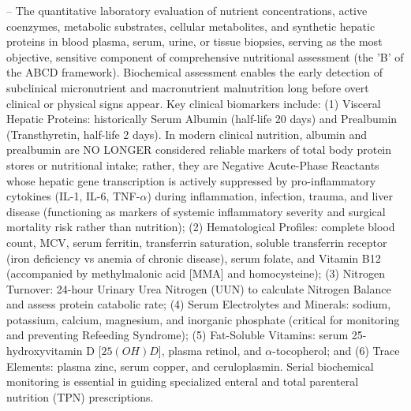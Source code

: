 -- The quantitative laboratory evaluation of nutrient concentrations, active coenzymes, metabolic substrates, cellular metabolites, and synthetic hepatic proteins in blood plasma, serum, urine, or tissue biopsies, serving as the most objective, sensitive component of comprehensive nutritional assessment (the 'B' of the ABCD framework). Biochemical assessment enables the early detection of subclinical micronutrient and macronutrient malnutrition long before overt clinical or physical signs appear. Key clinical biomarkers include: (1) Visceral Hepatic Proteins: historically Serum Albumin (half-life 20 days) and Prealbumin (Transthyretin, half-life 2 days). In modern clinical nutrition, albumin and prealbumin are NO LONGER considered reliable markers of total body protein stores or nutritional intake; rather, they are Negative Acute-Phase Reactants whose hepatic gene transcription is actively suppressed by pro-inflammatory cytokines (IL-1, IL-6, TNF-$\alpha$) during inflammation, infection, trauma, and liver disease (functioning as markers of systemic inflammatory severity and surgical mortality risk rather than nutrition); (2) Hematological Profiles: complete blood count, MCV, serum ferritin, transferrin saturation, soluble transferrin receptor (iron deficiency vs anemia of chronic disease), serum folate, and Vitamin B12 (accompanied by methylmalonic acid [MMA] and homocysteine); (3) Nitrogen Turnover: 24-hour Urinary Urea Nitrogen (UUN) to calculate Nitrogen Balance and assess protein catabolic rate; (4) Serum Electrolytes and Minerals: sodium, potassium, calcium, magnesium, and inorganic phosphate (critical for monitoring and preventing Refeeding Syndrome); (5) Fat-Soluble Vitamins: serum 25-hydroxyvitamin D [$25(OH)D$], plasma retinol, and $\alpha$-tocopherol; and (6) Trace Elements: plasma zinc, serum copper, and ceruloplasmin. Serial biochemical monitoring is essential in guiding specialized enteral and total parenteral nutrition (TPN) prescriptions.


